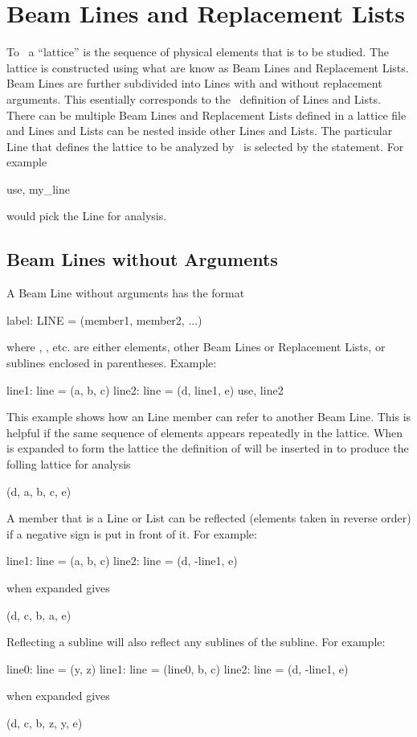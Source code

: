 \chapter{Beam Lines and Replacement Lists}

To \bmad\ a ``lattice'' is the sequence of physical elements that is to be studied.
The lattice is constructed using what are know as Beam Lines and Replacement Lists.
Beam Lines are further subdivided into Lines with and
without replacement arguments. This
esentially corresponds to the \mad\ definition of Lines and Lists. There can be multiple Beam
Lines and Replacement Lists defined in a lattice file and Lines and Lists can be
nested inside other Lines and Lists. The particular Line that defines
the lattice to be analyzed by \bmad\ is selected by the  statement. For example
\begin{example}
  use, my_line
\end{example}
would pick the Line  for analysis.

\section{Beam Lines without Arguments}
A Beam Line without arguments has the format
\begin{example}
  label: LINE = (member1, member2, ...)
\end{example}
where , , etc. are either elements, other Beam Lines or 
Replacement Lists, or sublines enclosed in parentheses.
Example:
\begin{example}
  line1: line = (a, b, c)
  line2: line = (d, line1, e)
  use, line2
\end{example}
This example shows how an Line member can refer to another Beam Line.
This is helpful if the same sequence of elements appears repeatedly in the lattice.
When  is expanded to form the lattice the definition of 
will be inserted 
in to produce the folling lattice for analysis
\begin{example}
  (d, a, b, c, e)
\end{example}

A member that is a Line or List can be reflected (elements taken in reverse order) if
a negative sign is put in front of it. For example:
\begin{example}
  line1: line = (a, b, c)
  line2: line = (d, -line1, e)
\end{example}
 when expanded gives
\begin{example}
  (d, c, b, a, e)
\end{example}
Reflecting a subline will also reflect any sublines of the subline. For example:
\begin{example}
  line0: line = (y, z)
  line1: line = (line0, b, c)
  line2: line = (d, -line1, e)
\end{example}
 when expanded gives
\begin{example}
  (d, c, b, z, y, e)
\end{example}

